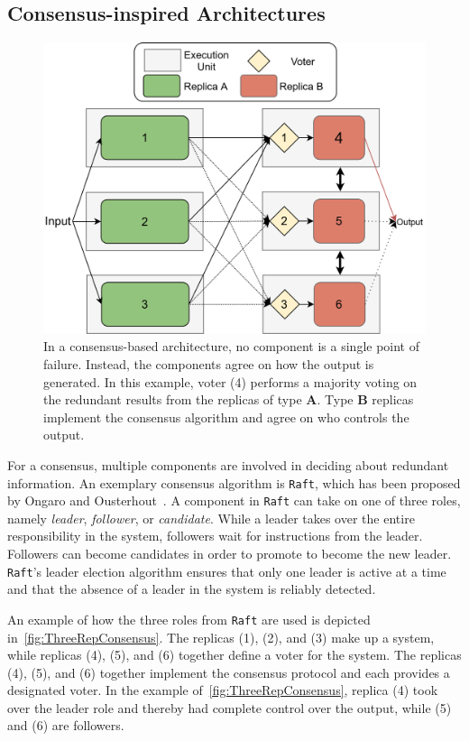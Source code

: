 \subsection{Consensus-inspired Architectures}
\label{subsec:consensusArchitecture}
\begin{figure}[!hb]
	\centering
	\includegraphics[width=0.8\linewidth]{images/ThreeComponentConsensus}
	\caption{In a consensus-based architecture, no component is a single point of failure. Instead, the components agree on how the output is generated. In this example, voter (4) performs a majority voting on the redundant results from the replicas of type \textbf{A}. Type \textbf{B} replicas implement the consensus algorithm and agree on who controls the output.}
	\label{fig:ThreeRepConsensus}
\end{figure}

For a consensus, multiple components are involved in deciding about redundant information.
An exemplary consensus algorithm is \texttt{Raft}, which has been proposed by Ongaro and Ousterhout~\cite{RaftConsensusPaper}.
A component in \texttt{Raft} can take on one of three roles, namely \textit{leader}, \textit{follower}, or \textit{candidate}.
While a leader takes over the entire responsibility in the system, followers wait for instructions from the leader.
Followers can become candidates in order to promote to become the new leader.
\texttt{Raft}'s leader election algorithm ensures that only one leader is active at a time and that the absence of a leader in the system is reliably detected.

An example of how the three roles from \texttt{Raft} are used is depicted in~\autoref{fig:ThreeRepConsensus}.
The replicas (1), (2), and (3) make up a  system, while replicas (4), (5), and (6) together define a voter for the system.
The replicas (4), (5), and (6) together implement the consensus protocol and each provides a designated voter.
In the example of~\autoref{fig:ThreeRepConsensus}, replica (4) took over the leader role and thereby had complete control over the output, while (5) and (6) are followers.
\\

